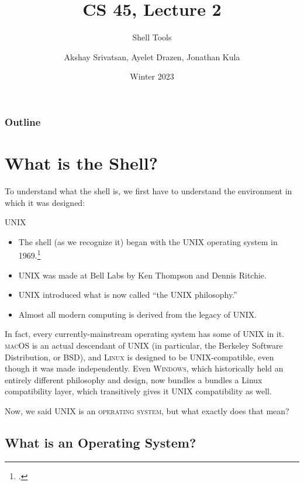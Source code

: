 \usepackage[bib]{shared/cs45}

\title{CS 45, Lecture 2}
\subtitle{Shell Tools}
\date{Winter 2023}
\author{Akshay Srivatsan, Ayelet Drazen, Jonathan Kula}



\maketitle

\frame{\titlepage}

\begin{frame}
  \frametitle{Outline}
  \tableofcontents[hidesubsections]
\end{frame}

\section{What is the Shell?}

To understand what the shell is, we first have to understand the environment in
which it was designed:

\begin{frame}{UNIX}
  \begin{itemize}
    \item
      The shell (as we recognize it) began with the UNIX \alert<2>{operating
      system} in 1969.\footcite{ritchie:unix}
    \item
      UNIX was made at Bell Labs by Ken Thompson and Dennis Ritchie.
    \item
      UNIX introduced what is now called \enquote{the UNIX philosophy.}
    \item
      Almost all modern computing is derived from the legacy of UNIX.
  \end{itemize}
\end{frame}

In fact, every currently-mainstream operating system has some of UNIX in it.
\textsc{macOS} is an actual descendant of UNIX (in particular, the Berkeley
Software Distribution, or BSD), and \textsc{Linux} is designed to be
UNIX-compatible, even though it was made independently. Even \textsc{Windows},
which historically held an entirely different philosophy and design, now
bundles a bundles a Linux compatibility layer, which transitively gives it UNIX
compatibility as well.

Now, we said UNIX is an \textsc{operating system}, but what exactly does that mean?

\subsection{What is an Operating System?}

